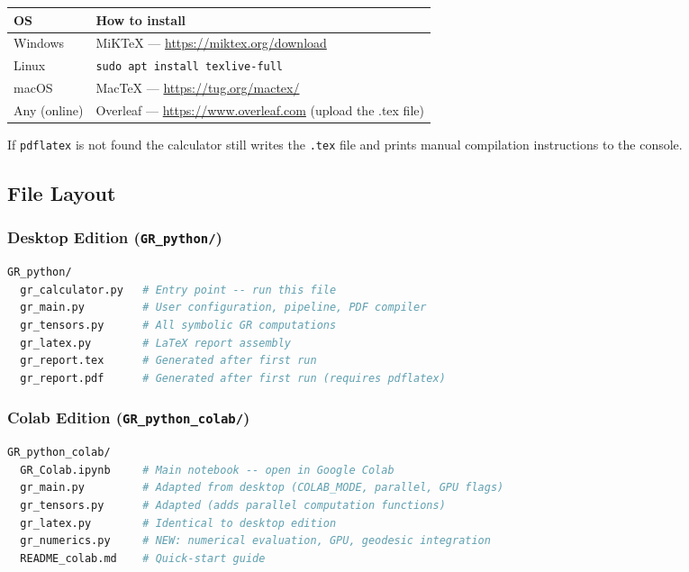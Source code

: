 \documentclass[11pt,a4paper]{article}
\newcommand{\code}[1]{\texttt{\small#1}}
\begin{document}
\begin{center}
\begin{tabular}{ll}
  \toprule
  OS & How to install \\
  \midrule
  Windows & MiKTeX — \url{https://miktex.org/download} \\
  Linux & \code{sudo apt install texlive-full} \\
  macOS & MacTeX — \url{https://tug.org/mactex/} \\
  Any (online) & Overleaf — \url{https://www.overleaf.com} (upload the .tex file) \\
  \bottomrule
\end{tabular}
\end{center}

If \code{pdflatex} is not found the calculator still writes the \code{.tex}
file and prints manual compilation instructions to the console.

\subsection{File Layout}

\subsubsection*{Desktop Edition (\code{GR\_python/})}

\begin{lstlisting}[language=bash,numbers=none]
GR_python/
  gr_calculator.py   # Entry point -- run this file
  gr_main.py         # User configuration, pipeline, PDF compiler
  gr_tensors.py      # All symbolic GR computations
  gr_latex.py        # LaTeX report assembly
  gr_report.tex      # Generated after first run
  gr_report.pdf      # Generated after first run (requires pdflatex)
\end{lstlisting}

\subsubsection*{Colab Edition (\code{GR\_python\_colab/})}

\begin{lstlisting}[language=bash,numbers=none]
GR_python_colab/
  GR_Colab.ipynb     # Main notebook -- open in Google Colab
  gr_main.py         # Adapted from desktop (COLAB_MODE, parallel, GPU flags)
  gr_tensors.py      # Adapted (adds parallel computation functions)
  gr_latex.py        # Identical to desktop edition
  gr_numerics.py     # NEW: numerical evaluation, GPU, geodesic integration
  README_colab.md    # Quick-start guide
\end{lstlisting}
\end{document}
